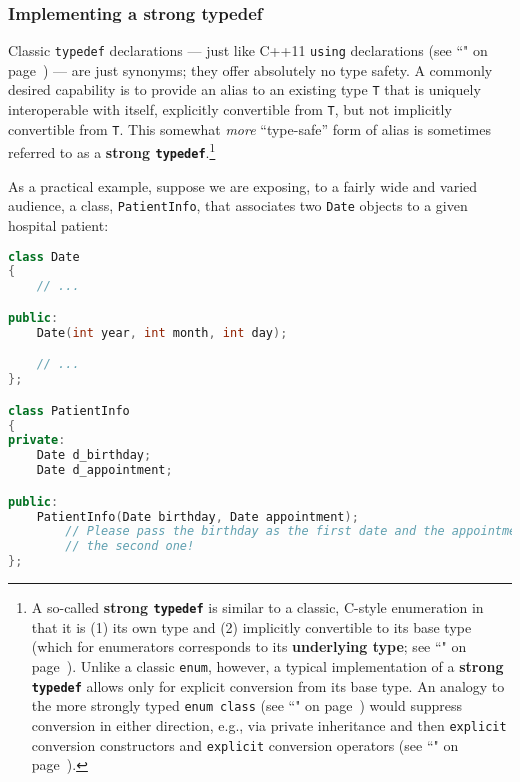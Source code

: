 \subsubsection[Implementing a strong {\tt typedef}]{Implementing a strong {\SubsubsecCode typedef}}\label{implementing-a-strong-typedef}

Classic \texttt{typedef} declarations --- just like C++11
\texttt{using} declarations (see ``" on page~\pageref{alias-declarations-and-alias-templates}) --- are just synonyms; they
offer absolutely no type safety. A commonly desired capability is to
provide an alias to an existing type \texttt{T} that is uniquely
interoperable with itself, explicitly convertible from \texttt{T}, but
not implicitly convertible from \texttt{T}. This somewhat \emph{more}
``type-safe'' form of alias is sometimes referred to as a \textbf{strong
\texttt{typedef}}.{\cprotect\footnote{A so-called \textbf{strong
  \texttt{typedef}} is similar to a classic, C-style enumeration in
  that it is (1) its own type and (2) implicitly convertible to its
  base type (which for enumerators corresponds to its
  \textbf{underlying type}; see ``" on page~\pageref{explicit-enumeration-underlying-type}). Unlike a classic
  \texttt{enum}, however, a typical implementation of a \textbf{strong
  \texttt{typedef}} allows only for explicit conversion from its base
  type. An analogy to the more strongly typed
\texttt{enum}~\texttt{class} (see ``" on page~\pageref{enumclass}) would suppress conversion
  in either direction, e.g., via private inheritance and then
  \texttt{explicit} conversion constructors and
 \texttt{explicit} conversion operators (see ``" on page~\pageref{explicit-conversion-operators}).}}

As a practical example, suppose we are exposing, to a fairly wide and varied audience, a class,
\texttt{PatientInfo}, that associates two \texttt{Date} objects to a
given hospital patient:

\begin{lstlisting}[language=C++]
class Date
{
    // ...

public:
    Date(int year, int month, int day);

    // ...
};

class PatientInfo
{
private:
    Date d_birthday;
    Date d_appointment;

public:
    PatientInfo(Date birthday, Date appointment);
        // Please pass the birthday as the first date and the appointment as
        // the second one!
};
\end{lstlisting}

